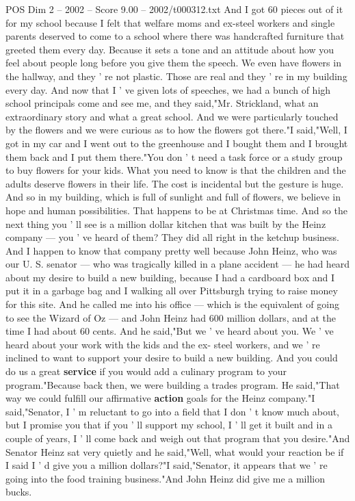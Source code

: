 \begin{textsample}{POS Dim 2 – 2002 – Score 9.00 – 2002/t000312.txt}
And I got 60 pieces out of it for my school because I felt that welfare moms and ex-steel workers and single parents deserved to come to a school where there was handcrafted furniture that greeted them every day.
Because it sets a tone and an attitude about how you feel about people long before you give them the speech.
We even have flowers in the hallway, and they ' re not plastic.
Those are real and they ' re in my building every day.
And now that I ' ve given lots of speeches, we had a bunch of high school principals come and see me, and they said,"Mr.
Strickland, what an extraordinary story and what a great school.
And we were particularly touched by the flowers and we were curious as to how the flowers got there."I said,"Well, I got in my car and I went out to the greenhouse and I bought them and I brought them back and I put them there."You don ' t need a task force or a study group to buy flowers for your kids.
What you need to know is that the children and the adults deserve flowers in their life.
The cost is incidental but the gesture is huge.
And so in my building, which is full of sunlight and full of flowers, we believe in hope and human possibilities.
That happens to be at Christmas time.
And so the next thing you ' ll see is a million dollar kitchen that was built by the Heinz company — you ' ve heard of them?
They did all right in the ketchup business.
And I happen to know that company pretty well because John Heinz, who was our U.
S. senator — who was tragically killed in a plane accident — he had heard about my desire to build a new building, because I had a cardboard box and I put it in a garbage bag and I walking all over Pittsburgh trying to raise money for this site.
And he called me into his office — which is the equivalent of going to see the Wizard of Oz — and John Heinz had 600 million dollars, and at the time I had about 60 cents.
And he said,"But we ' ve heard about you.
We ' ve heard about your work with the kids and the ex- steel workers, and we ' re inclined to want to support your desire to build a new building.
And you could do us a great \textbf{service} if you would add a culinary program to your program."Because back then, we were building a trades program.
He said,"That way we could fulfill our affirmative \textbf{action} goals for the Heinz company."I said,"Senator, I ' m reluctant to go into a field that I don ' t know much about, but I promise you that if you ' ll support my school, I ' ll get it built and in a couple of years, I ' ll come back and weigh out that program that you desire."And Senator Heinz sat very quietly and he said,"Well, what would your reaction be if I said I ' d give you a million dollars?"I said,"Senator, it appears that we ' re going into the food training business."And John Heinz did give me a million bucks.

\end{textsample}
